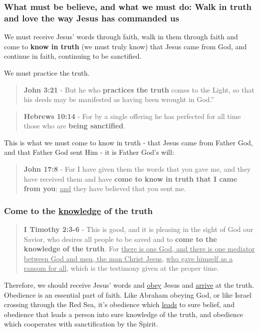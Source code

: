 \documentclass[11pt]{article}
\begin{document}
\subsubsection{What must be believe, and what we must do: Walk in \textbf{truth} and \textbf{love} the way Jesus has commanded us}
\label{sec:org1f103fe}

We must receive Jesus' words through faith, walk in them through faith and come to \textbf{know in truth} (we must truly know) that Jesus came from God, and continue in faith, continuing to be sanctified.

We must practice the truth.

\begin{quote}
\textbf{John 3:21} - But he who \textbf{practices the truth} comes to the Light, so that his deeds may be manifested as having been wrought in God.”
\end{quote}

\begin{quote}
\textbf{Hebrews 10:14} - For by a single offering he has perfected for all time those who are \textbf{being sanctified}.
\end{quote}

This is what we must come to know in truth - that Jesus came from Father God, and that Father God sent Him - it is Father God's will:

\begin{quote}
\textbf{John 17:8} - For I have given them the words that you gave me, and they have received them and have \textbf{come to know in truth that I came from you}; \uline{and} they have believed that you sent me.
\end{quote}

\subsubsection{Come to the \underline{knowledge} of the truth}
\label{sec:orgbe187a3}

\begin{quote}
\textbf{I Timothy 2:3-6} - This is good, and it is pleasing in the sight of God our Savior, who desires all people to be saved and to \textbf{come to the knowledge of the truth}. For \uline{there is one God, and there is one mediator between God and men, the man Christ Jesus}, \uline{who gave himself as a ransom for all}, which is the testimony given at the proper time.
\end{quote}

Therefore, we should receive Jesus' words and \uline{obey} Jesus and \uline{arrive} at the truth. Obedience is an essential part of faith. Like Abraham obeying God, or like Israel crossing through the Red Sea, it's obedience which \uline{leads} to sure belief, and obedience that leads a person into sure knowledge of the truth, and obedience which cooperates with sanctification by the Spirit.
\end{document}
